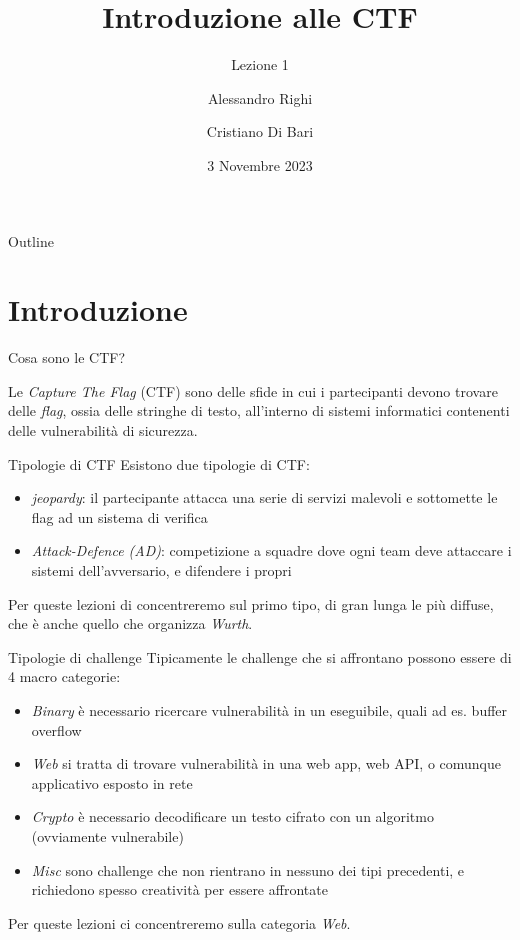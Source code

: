 \documentclass{beamer}
\title{Introduzione alle CTF}
\subtitle{Lezione 1}
\author{Alessandro Righi \and Cristiano Di Bari}
\institute{Università degli Studi di Verona}
\date{3 Novembre 2023}
\begin{document}
\begin{frame}
\titlepage
\end{frame}

\begin{frame}{Outline}
\tableofcontents
\end{frame}

\section{Introduzione}

\begin{frame}{Cosa sono le CTF?}

Le \textit{Capture The Flag} (CTF) sono delle sfide in cui i partecipanti 
devono trovare delle \textit{flag}, ossia delle stringhe di testo, all'interno
di sistemi informatici contenenti delle vulnerabilità di sicurezza. 
\end{frame}

\begin{frame}{Tipologie di CTF}
Esistono due tipologie di CTF:
\begin{itemize}
    \item \textit{jeopardy}: il partecipante attacca una serie di servizi malevoli e sottomette le flag ad un sistema di verifica
    \item \textit{Attack-Defence (AD)}: competizione a squadre dove ogni team deve attaccare i sistemi dell'avversario, e difendere i propri
\end{itemize}

Per queste lezioni di concentreremo sul primo tipo, di gran lunga le più diffuse, che è anche
quello che organizza \textit{Wurth}.
\end{frame}

\begin{frame}{Tipologie di challenge}
Tipicamente le challenge che si affrontano possono essere di 4 macro categorie:
\begin{itemize}
    \item \textit{Binary} è necessario ricercare vulnerabilità in un eseguibile, quali ad es. buffer overflow
    \item \textit{Web} si tratta di trovare vulnerabilità in una web app, web API, o comunque applicativo esposto in rete
    \item \textit{Crypto} è necessario decodificare un testo cifrato con un algoritmo (ovviamente vulnerabile)
    \item \textit{Misc} sono challenge che non rientrano in nessuno dei tipi precedenti, e richiedono spesso creatività per essere affrontate
\end{itemize}

Per queste lezioni ci concentreremo sulla categoria \textit{Web}.
\end{frame}
\end{document}
